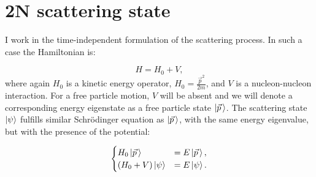 \section{2N scattering state}





    I work in the time-independent formulation of the scattering process.
    In such a case the Hamiltonian is:

    \begin{equation}
        H = H_0 + V,
    \end{equation}
    where again $H_0$ is a kinetic energy operator, $H_0 = \frac{\vec{p}^2}{2m}$, 
    and $V$ is a nucleon-nucleon interaction.
    For a free particle motion, $V$ will be absent and we will denote a corresponding energy eigenstate as
    a free particle state $\ket{\vec{p}\,}$.
    The scattering state $\ket{\psi}$ fulfills similar Schr\"{o}dinger equation as 
    $\ket{\vec{p}\,}$, with the same energy eigenvalue,
    but with the presence of the potential:
    


    \begin{equation}
        \begin{cases}
            H_0 \ket{\vec{p}\,} &= E \ket{\vec{p}\,}, \\
            (H_0 + V) \ket{\psi} &= E \ket{\psi}.
        \end{cases}
        \label{system}
    \end{equation}

